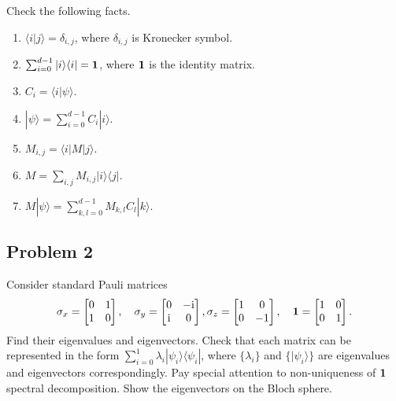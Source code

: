 \documentclass[a4paper,10pt]{article}
\newcommand{\ket}[1]{|#1\rangle}
\newcommand{\bra}[1]{\langle#1|}
\begin{document}
Check the following facts.
\begin{enumerate}
	\item $\bra{i}j\rangle = \delta_{i,j}$, where $\delta_{i,j}$ is Kronecker symbol.
	\item $\sum_{i=0}^{d-1}\ket{i}\bra{i}={\bf 1}$, where ${\bf 1}$ is the identity matrix.
	\item $C_i = \bra{i} \psi \rangle$.
	\item $\ket{\psi}=\sum_{i=0}^{d-1} C_i \ket{i}$.
	\item $M_{i,j} = \bra{i}M\ket{j}$.
	\item $M=\sum_{i,j}M_{i,j}\ket{i}\bra{j}$.
	\item $M\ket{\psi}=\sum_{k,l=0}^{d-1}M_{k,l}C_l\ket{k}$.
\end{enumerate}


\subsection*{Problem 2}
Consider standard Pauli matrices
\begin{equation}
	\sigma_x = \begin{bmatrix}
	0 & 1 \\ 1 & 0 \\
	\end{bmatrix}, \quad
		\sigma_y = \begin{bmatrix}
	0 & -{\rm i} \\ {\rm i} & 0 \\
	\end{bmatrix}, 
	\sigma_z = \begin{bmatrix}
		1 & 0 \\ 0 & -1 \\
	\end{bmatrix}, \quad
	{\bf 1} = \begin{bmatrix}
		1 & 0 \\ 0 & 1
	\end{bmatrix}.
\end{equation}
Find their eigenvalues and eigenvectors. 
Check that each matrix can be represented in the form $\sum_{i=0}^{1}\lambda_i\ket{\psi_i}\bra{\psi_i}$, where $\{\lambda_i\}$ and $\{\ket{\psi_i}\}$ are eigenvalues and eigenvectors correspondingly.
Pay special attention to non-uniqueness of ${\bf 1}$ spectral decomposition.
Show the eigenvectors on the Bloch sphere.
\end{document}
